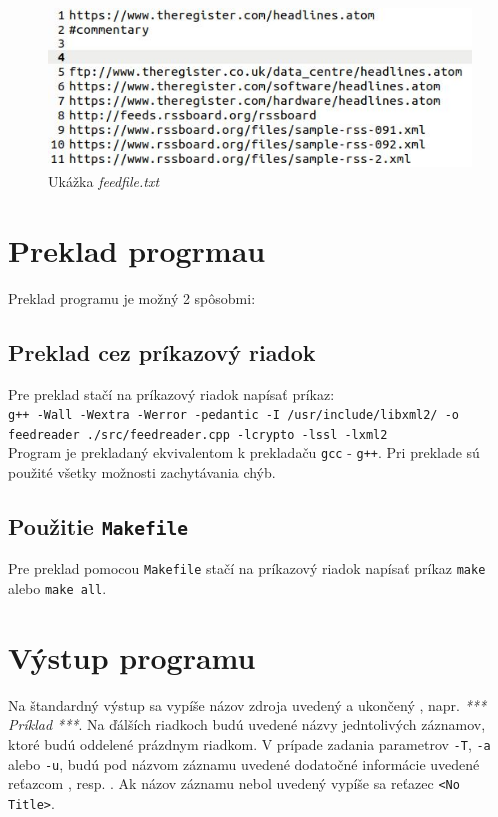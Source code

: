 \documentclass[a4paper, 11pt]{article}
\begin{document}
    \begin{figure}[h]
        \centering
        \includegraphics[width=0.8\linewidth]{img/feedfile.JPG}
        \caption{Ukážka \textit{feedfile.txt}}
        \label{feedfile_fig}
    \end{figure}
    

    \section{Preklad progrmau}
    \label{compile}
    Preklad programu je možný 2 spôsobmi:
    
    \subsection{Preklad cez príkazový riadok}
    \label{terminal}
    Pre preklad stačí na príkazový riadok napísať príkaz: \\
    
    \texttt{g++ -Wall -Wextra -Werror -pedantic -I /usr/include/libxml2/ -o feedreader ./src/feedreader.cpp -lcrypto -lssl -lxml2} \\
    
    Program je prekladaný ekvivalentom k prekladaču \texttt{gcc} - \texttt{g++}. Pri preklade sú použité všetky možnosti zachytávania chýb.
    
    \subsection{Použitie \texttt{Makefile}}
    \label{makefile}
    Pre preklad pomocou \texttt{Makefile} stačí na príkazový riadok napísať príkaz \texttt{make} alebo \texttt{make all}.

    \section{Výstup programu}
    \label{output}
    Na štandardný výstup sa vypíše názov zdroja uvedený \uv{***} a ukončený \uv{***}, napr. \textit{*** Príklad ***}. Na ďálších riadkoch budú uvedené názvy jedntolivých záznamov, ktoré budú oddelené prázdnym riadkom.
    V prípade zadania parametrov \texttt{-T}, \texttt{-a} alebo \texttt{-u}, budú pod názvom záznamu uvedené dodatočné informácie uvedené reťazcom ,  resp. . Ak názov záznamu nebol uvedený vypíše sa reťazec \texttt{<No Title>}. \\
\end{document}
